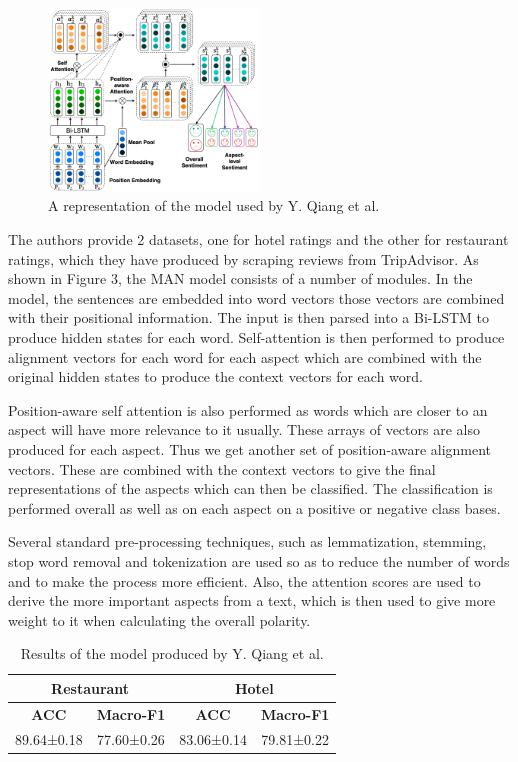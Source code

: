 \documentclass[conference]{IEEEtran}
\begin{document}
\begin{figure}[htbp]
\centerline{\includegraphics[keepaspectratio, width=0.5\textwidth]{pics/3.png}}
\caption{A representation of the model used by Y. Qiang et al.}
\label{fig}
\end{figure}

The authors provide 2 datasets, one for hotel ratings and the other for restaurant ratings, which they have produced by scraping reviews from TripAdvisor. As shown in Figure 3, the MAN model consists of a number of modules. In the model, the sentences are embedded into word vectors those vectors are combined with their positional information. The input is then parsed into a Bi-LSTM to produce hidden states for each word. Self-attention is then performed to produce alignment vectors for each word for each aspect which are combined with the original hidden states to produce the context vectors for each word.

Position-aware self attention is also performed as words which are closer to an aspect will have more relevance to it usually. These arrays of vectors are also produced for each aspect. Thus we get another set of position-aware alignment vectors. These are combined with the context vectors to give the final representations of the aspects which can then be classified. The classification is performed overall as well as on each aspect on a positive or negative class bases.

Several standard pre-processing techniques, such as lemmatization, stemming, stop word removal and tokenization are used so as to reduce the number of words and to make the process more efficient. Also, the attention scores are used to derive the more important aspects from a text, which is then used to give more weight to it when calculating the overall polarity.

\begin{table}[htbp]
\caption{Results of the model produced by Y. Qiang et al.}
\begin{center}
\begin{tabular}{|c|c|c|c|}
\hline
\multicolumn{2}{|c|}{\textbf{Restaurant}} & \multicolumn{2}{|c|}{\textbf{Hotel}} \\
\hline
\textbf{ACC} & \textbf{Macro-F1} & \textbf{ACC} & \textbf{Macro-F1} \\
\hline
89.64±0.18 & 77.60±0.26 & 83.06±0.14 & 79.81±0.22 \\
\hline
\end{tabular}
\end{center}
\end{table}
\end{document}
